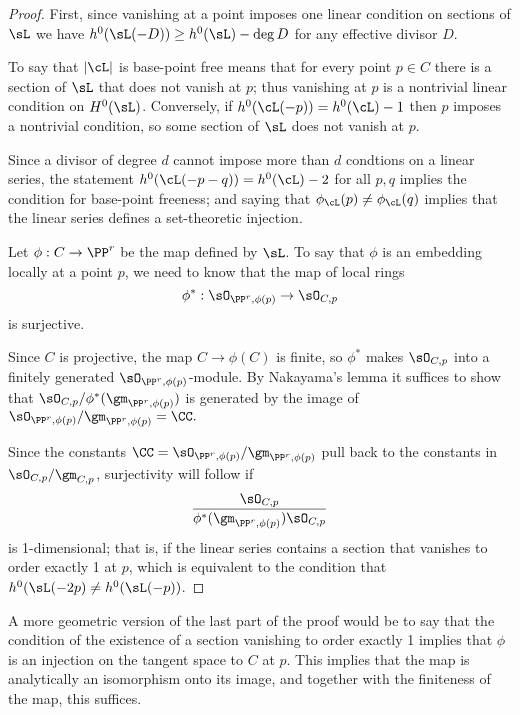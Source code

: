 \begin{proof}
First, since vanishing at a point imposes one linear condition on sections of $\sL$ we have $h^0(\sL(-D)) \geq h^0(\sL)-\deg D$ for any
effective divisor $D$.

To say that $|\cL|$ is base-point free means that for every point $p\in C$ there is a section of $\sL$ that does not vanish at $p$; thus vanishing
at $p$ is a nontrivial linear condition on $H^0(\sL)$. Conversely, if $h^0(\cL(-p)) = h^0(\cL) - 1$ then $p$ imposes a nontrivial condition, so
some section of $\sL$ does not vanish at $p$.

Since a divisor of degree $d$ cannot impose more than $d$ condtions on a linear series, the statement $h^0(\cL(-p-q)) = h^0(\cL) - 2$ for all $p, q$ implies the condition for base-point freeness; and saying that $\phi_\cL(p) \neq \phi_\cL(q)$ implies that the linear series defines a set-theoretic injection. 


Let $\phi:C \to \PP^r$ be the map defined by $\sL$. To say that $\phi$  is an embedding locally at a point $p$, we need to know that the map of local rings
$$
\phi^*: \sO_{\PP^r,\phi(p)} \to \sO_{C,p} 
$$
is surjective. 

Since $C$ is projective, the map $C\to \phi(C)$ is finite,
so $\phi^*$ makes $\sO_{C,p}$ into a finitely generated $\sO_{\PP^r,\phi(p)}$-module.
By Nakayama's lemma it suffices to show that 
$\sO_{C,p}/\phi^*(\gm_{\PP^r,\phi(p)})$
is generated by the image of $\sO_{\PP^r,\phi(p)}/\gm_{\PP^r,\phi(p)} = \CC.$

 Since the constants  $\CC =\sO_{\PP^r,\phi(p)}/\gm_{\PP^r,\phi(p)}$ pull back to the constants in
$\sO_{C,p}/\gm_{C,p}$,
surjectivity will follow if 
$$
\frac{\sO_{C,p}}
{\phi^*(\gm_{\PP^r,\phi(p)})  \sO_{C,p}}
$$
is 1-dimensional; that is, if the linear series contains
a section that vanishes to order exactly 1 at $p$, which is equivalent to the condition
that $h^0(\sL(-2p) \neq h^0(\sL(-p))$.
\end{proof}

A more geometric version of the last part of the proof would be to say that the condition of the existence of a section
vanishing to order exactly 1 implies that $\phi$ is an injection on the tangent space to $C$ at $p$. This implies that
the map is analytically an isomorphism onto its image, and together with the finiteness of the map, this suffices.

